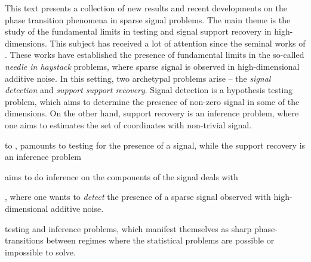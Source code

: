 
\preface



%
 


This text presents a collection of new results and recent developments on the phase transition phenomena in sparse signal problems.
The main theme is the study of the fundamental limits in testing and signal support recovery in high-dimensions.  This subject has 
received a lot of attention since the seminal works of \cite{ingster1998minimax,donoho2004higher} . These works
have established the presence of fundamental limits in the so-called {\em needle in haystack} problems, where sparse 
signal is observed in high-dimensional additive noise.  In this setting, two archetypal problems arise -- the {\em signal detection} and 
{\em support support recovery}.  Signal detection is a hypothesis testing problem, which aims to determine the presence of non-zero
signal in some of the dimensions. On the other hand, support recovery is an inference problem, where one aims to estimates the set of
coordinates with non-trivial signal.



  to , pamounts to testing for the presence of a signal, while the support recovery is an inference problem 

aims to do inference 
on the components of the signal  deals with 

 , where one wants to {\em detect}
the presence of a sparse signal observed with high-dimensional additive noise.  

testing and inference problems, which manifest themselves 
as sharp phase-transitions between regimes where the statistical problems are possible or impossible to solve.  

